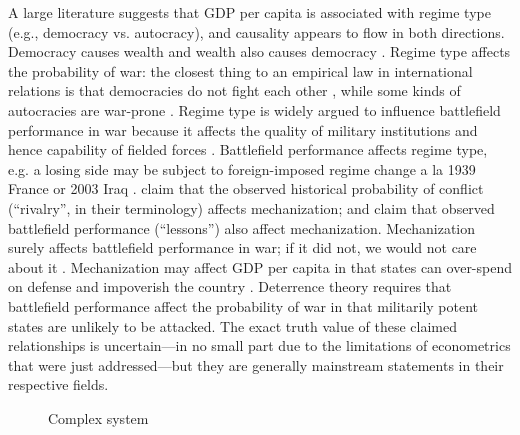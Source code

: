 \documentclass{article}
\begin{document}
A large literature suggests that GDP per capita is associated with
regime type (e.g., democracy vs. autocracy), and causality appears to flow in
both directions. Democracy causes wealth and wealth also causes democracy \citep{helliwell1994empirical,barro1996democracy,robinson2006economic,doucouliagos2008democracy}. 
Regime type affects the probability of war: the closest thing to an empirical law in international relations is
that democracies do not fight each other
\citep{levy1988domestic}, while some kinds of autocracies are war-prone \citep{de1995war}. 
Regime type is widely argued to influence
battlefield performance in war because it affects the quality of military institutions and hence
capability of fielded forces \citep{reiter2002democracies,weeks2014dictators,talmadge2015dictator}. 
Battlefield performance affects regime type, e.g. a losing side may be subject to foreign-imposed
regime change a la 1939 France or 2003 Iraq
\citep{werner1996absolute,lo2008ensuring,downes2013forced}. \citet{sechser2010army} claim that the observed
historical probability of conflict (``rivalry'', in their terminology) affects mechanization; and claim that observed
battlefield performance (``lessons'') also affect mechanization. Mechanization surely affects
battlefield performance in war; if it did not, we would not care about it
\citep[see also][]{lyall2009rage}.
Mechanization may affect GDP per capita in that states can over-spend on defense and 
impoverish the country
\citep{cappelen1984military,ward1992sizing,abu2003government}. Deterrence theory requires that 
battlefield performance affect the probability of war in that militarily 
potent states are unlikely to be attacked. The exact truth value of these claimed relationships is
uncertain---in no small part due to the limitations of econometrics that were just addressed---but
they are generally mainstream statements in their respective fields.

\begin{figure}[h]
	\centering
	\caption{Complex system}
\end{figure}
\end{document}
